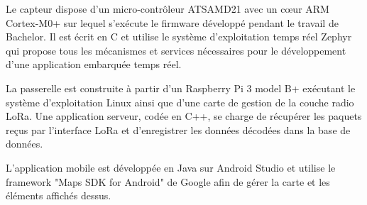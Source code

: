 \begin{normalsize}
Le capteur dispose d'un micro-contrôleur ATSAMD21 avec un cœur ARM Cortex-M0+ sur lequel s'exécute le firmware développé pendant le travail de Bachelor. Il est écrit en C et utilise le système d'exploitation temps réel Zephyr qui propose tous les mécanismes et services nécessaires pour le développement d'une application embarquée temps réel.

La passerelle est construite à partir d'un Raspberry Pi 3 model B+ exécutant le système d'exploitation Linux ainsi que d'une carte de gestion de la couche radio LoRa. Une application serveur, codée en C++, se charge de récupérer les paquets reçus par l'interface LoRa et d'enregistrer les données décodées dans la base de données.

L'application mobile est développée en Java sur Android Studio et utilise le framework "Maps SDK for Android" de Google afin de gérer la carte et les éléments affichés dessus.

\end{normalsize}